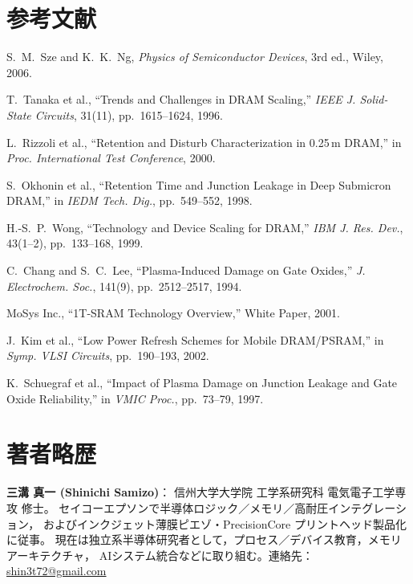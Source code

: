 \documentclass[conference]{IEEEtran}
\begin{document}
\section*{参考文献}
\begin{thebibliography}{00}
S.~M.~Sze and K.~K.~Ng, \emph{Physics of Semiconductor Devices}, 3rd ed., Wiley, 2006.

T.~Tanaka et al., ``Trends and Challenges in DRAM Scaling,'' \emph{IEEE J. Solid-State Circuits}, 31(11), pp.~1615--1624, 1996.

L.~Rizzoli et al., ``Retention and Disturb Characterization in 0.25\,\textmu m DRAM,'' in \emph{Proc. International Test Conference}, 2000.

S.~Okhonin et al., ``Retention Time and Junction Leakage in Deep Submicron DRAM,'' in \emph{IEDM Tech. Dig.}, pp.~549--552, 1998.

H.-S.~P.~Wong, ``Technology and Device Scaling for DRAM,'' \emph{IBM J. Res. Dev.}, 43(1–2), pp.~133--168, 1999.

C.~Chang and S.~C.~Lee, ``Plasma-Induced Damage on Gate Oxides,'' \emph{J. Electrochem. Soc.}, 141(9), pp.~2512--2517, 1994.

MoSys Inc., ``1T-SRAM Technology Overview,'' White Paper, 2001.

J.~Kim et al., ``Low Power Refresh Schemes for Mobile DRAM/PSRAM,'' in \emph{Symp. VLSI Circuits}, pp.~190--193, 2002.

K.~Schuegraf et al., ``Impact of Plasma Damage on Junction Leakage and Gate Oxide Reliability,'' in \emph{VMIC Proc.}, pp.~73--79, 1997.
\end{thebibliography}

\section*{著者略歴}
\noindent\textbf{三溝 真一 (Shinichi Samizo)}：
信州大学大学院 工学系研究科 電気電子工学専攻 修士。
セイコーエプソンで半導体ロジック／メモリ／高耐圧インテグレーション，
およびインクジェット薄膜ピエゾ・PrecisionCore プリントヘッド製品化に従事。
現在は独立系半導体研究者として，プロセス／デバイス教育，メモリアーキテクチャ，
AIシステム統合などに取り組む。連絡先：\href{mailto:shin3t72@gmail.com}{shin3t72@gmail.com}
\end{document}
